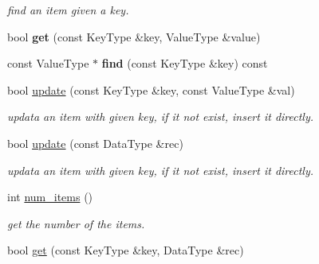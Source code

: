 \begin{CompactItemize}
\begin{CompactList}\small\item\em find an item given a key. \item\end{CompactList}\item 
\hypertarget{classBTreeFile_60b7d0a808434cf7e6133597564068c7}{
bool \textbf{get} (const KeyType \&key, ValueType \&value)}
\label{classBTreeFile_60b7d0a808434cf7e6133597564068c7}

\item 
\hypertarget{classBTreeFile_9ea7b759915249cdc8d4b1ed22f445f9}{
const ValueType $\ast$ \textbf{find} (const KeyType \&key) const }
\label{classBTreeFile_9ea7b759915249cdc8d4b1ed22f445f9}

\item 
\hypertarget{classBTreeFile_c0133f9c22ff22f0bb9c64aded50161d}{
bool \hyperlink{classBTreeFile_c0133f9c22ff22f0bb9c64aded50161d}{update} (const KeyType \&key, const ValueType \&val)}
\label{classBTreeFile_c0133f9c22ff22f0bb9c64aded50161d}

\begin{CompactList}\small\item\em updata an item with given key, if it not exist, insert it directly. \item\end{CompactList}\item 
\hypertarget{classBTreeFile_65845fcc4fd01a769dcf74ac35e233f1}{
bool \hyperlink{classBTreeFile_65845fcc4fd01a769dcf74ac35e233f1}{update} (const DataType \&rec)}
\label{classBTreeFile_65845fcc4fd01a769dcf74ac35e233f1}

\begin{CompactList}\small\item\em updata an item with given key, if it not exist, insert it directly. \item\end{CompactList}\item 
\hypertarget{classBTreeFile_86b258ecee50f2c59e8483750e32aec6}{
int \hyperlink{classBTreeFile_86b258ecee50f2c59e8483750e32aec6}{num\_\-items} ()}
\label{classBTreeFile_86b258ecee50f2c59e8483750e32aec6}

\begin{CompactList}\small\item\em get the number of the items. \item\end{CompactList}\item 
\hypertarget{classBTreeFile_b2ec25ed3809699f44bb5a723e53e94e}{
bool \hyperlink{classBTreeFile_b2ec25ed3809699f44bb5a723e53e94e}{get} (const KeyType \&key, DataType \&rec)}
\label{classBTreeFile_b2ec25ed3809699f44bb5a723e53e94e}


\end{CompactItemize}
